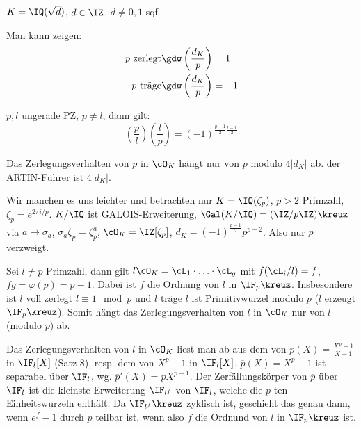 \begin{Bemerkung}
 $K=\IQ(\sqrt d)$, $d\in\IZ$, $d\neq 0,1$ sqf.
 
 Man kann zeigen:
 \begin{align*}
  p \text{ zerlegt} & \gdw \left(\frac{d_K}{p}\right)=1\\
  p \text{ träge} & \gdw \left(\frac{d_K}{p}\right)=-1\\
 \end{align*}
\end{Bemerkung}

\begin{Satz}
 $p,l$ ungerade PZ, $p\neq l$, dann gilt: \[ \left(\frac{p}{l} \right)\left(\frac{l}{p}\right)=(-1)^{\frac{p-1}{2}\frac{l-1}{2}}\]
\end{Satz}

\begin{Folgerung}
 Das Zerlegungsverhalten von $p$ in $\cO_K$ hängt nur von $p$ modulo $4|d_K|$ ab. \folge der ARTIN-Führer ist $4|d_K|$.
\end{Folgerung}

\begin{Beispiel}[Kreisteilungskörper]
 Wir manchen es uns leichter und betrachten nur $K=\IQ(\zeta_p)$, $p>2$ Primzahl, $\zeta_p=e^{2\pi i/p}$. $K/\IQ$ ist GALOIS-Erweiterung, $\Gal(K/\IQ)=(\IZ/p\IZ)\kreuz$ via $a\mapsto \sigma_a$, $\sigma_a\zeta_p=\zeta_p^a$, $\cO_K=\IZ[\zeta_p]$, $d_K=(-1)^{\frac{p-1}{2}}p^{p-2}$. Also nur $p$ verzweigt.
\end{Beispiel}

\begin{Fakt}
 Sei $l\neq p$ Primzahl, dann gilt $l\cO_K=\cL_1\cdot\ldots\cdot\cL_g$ mit $f(\cL_i/l)=f$, $fg=\varphi(p)=p-1$. Dabei ist $f$ die Ordnung von $l$ in $\IF_p\kreuz$. Insbesondere ist $l$ voll zerlegt \gdw $l\equiv 1 \mod{p}$ und $l$ träge \gdw $l$ ist Primitivwurzel modulo $p$ (\gdw $l$ erzeugt $\IF_p\kreuz$). Somit hängt das Zerlegungsverhalten von $l$ in $\cO_K$ nur von $l$ (modulo $p$) ab.
 \end{Fakt}

\begin{Beweis}
 Das Zerlegungsverhalten von $l$ in $\cO_K$ liest man ab aus dem von $p(X)=\frac{X^p-1}{X-1}$ in $\IF_l[X]$ (Satz 8), resp. dem von $X^p-1$ in $\IF_l[X]$. $\overline p(X)=X^p-1$ ist separabel über $\IF_l$, wg. $\overline p'(X)=pX^{p-1}$. Der Zerfällungskörper von $\overline p$ über $\IF_l$ ist die kleinste Erweiterung $\IF_{l^f}$ von $\IF_l$, welche die $p$-ten Einheitswurzeln enthält. Da $\IF_{l^f}\kreuz$ zyklisch ist, geschieht das genau dann, wenn $e^f-1$ durch $p$ teilbar ist, wenn also $f$ die Ordnund von $l$ in $\IF_p\kreuz$ ist.
\end{Beweis}

